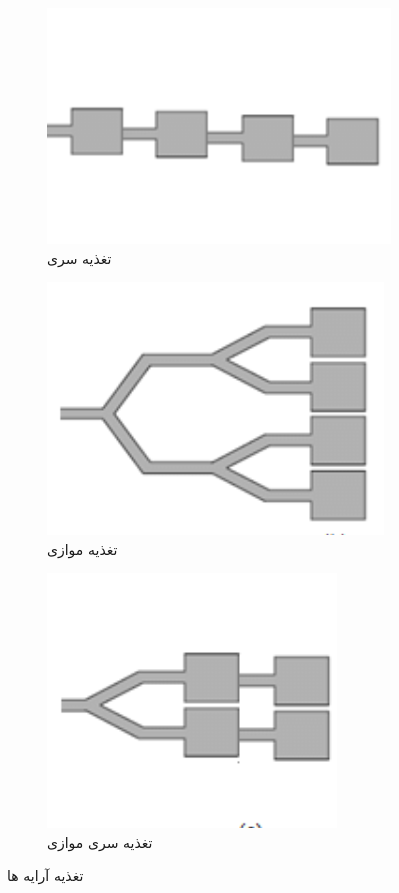 \begin{figure}[t]
	\centering
	\begin{subfigure}{0.3\textwidth} %
		\includegraphics[scale=0.2]{Images/fig12.png}
		\caption{تغذیه سری} %
		\label{fig12}
	\end{subfigure}
	\vspace{1em} %
	\begin{subfigure}{0.3\textwidth} %
		\includegraphics[scale=0.2]{Images/fig13.png}
		\caption{تغذیه موازی} %
		\label{fig13}
	\end{subfigure}
		\vspace{1em} %
	\begin{subfigure}{0.3\textwidth} %
		\includegraphics[scale=0.2]{Images/fig14.png}
		\caption{تغذیه سری موازی} %
		\label{fig14}
	\end{subfigure}
	\caption{تغذیه آرایه ها}
\end{figure}


